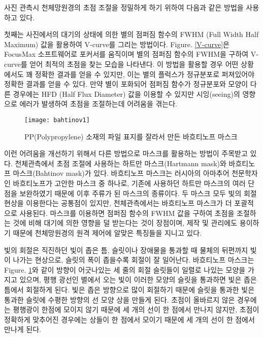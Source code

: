 사진 관측시 천체망원경의 초점 조절을 정밀하게 하기 위하여 다음과 같은 방법을 사용하고 있다. 

첫째는 사진에서의 대기의 상태에 의한 별의 점퍼짐 함수의 FWHM (Full Width Half Maximum) 값을 활용하여 V-curve를 그리는 방법이다. \textrm{Figure}. \ref{V-curve}은 FocusMax 소프트웨어로 포커서를 움직이며 별의 점퍼짐 함수의 FWHM을 구하여 V-curve를 얻어 최적의 초점을 찾는 모습을 나타낸다. 이 방법을 활용할 경우 어떤 상황에서도 꽤 정확한 결과를 얻을 수 있지만, 이는 별의 플럭스가 정규분포로 퍼져있어야 정확한 결과를 얻을 수 있다. 만약 별이 포화되어 점퍼짐 함수가 정규분포와 모양이 다른 경우에는 HFD (Half Flux Diameter) 값을 이용할 수 있지만 시잉(seeing)의 영향으로 에러가 발생하여 초점을 조절하는데 어려움을 겪는다. 

\begin{figure}[h]
	\begin{center}
		\texttt{[image: bahtinov1]}
	\end{center}
	\caption{PP(Polypropylene) 소재의 파일 표지를 잘라서 만든 바흐티노프 마스크}
	\label{bahtinov}
\end{figure}

이런 어려움을 개선하기 위해서 다른 방법으로 마스크를 활용하는 방법이 주목받고 있다. 천체관측에서 초점 조절에 사용하는 하트만 마스크(Hartmann mask)와 바흐티노프 마스크(Bahtinov mask)가 있다. 바흐티노프 마스크는 러시아의 아마추어 천문학자인 바흐티노프가 고안한 마스크 중 하나로, 기존에 사용하던 하트만 마스크의 여러 단점을 보완하였기 때문에 이후 주류가 된 마스크의 종류이다. 두 마스크 모두 빛의 회절 현상을 이용한다는 공통점이 있지만, 천체관측에서는 바흐티노프 마스크가 더 포괄적으로 사용된다. 마스크를 이용하면 점퍼짐 함수의 FWHM 값을 구하여 초점을 조절하는 것에 비해 대기에 의한 영향을 덜 받는다는 것이 장점이며, 제작 및 관리에도 용이하기 때문에 천체망원경의 원격 제어에 알맞은 특징들을 지니고 있다. 

빛의 회절은 직진하던 빛이 좁은 틈, 슬릿이나 장애물을 통과할 때 물체의 뒤편까지 빛이 나가는 현상으로, 슬릿의 폭이 좁을수록 회절이 잘 일어난다. 바흐티노프 마스크는 Figure. \ref{bahtinov}와 같이 방향이 어긋나있는 세 줄의 회절 슬릿들이 일렬로 나있는 모양을 가지고 있으며, 평행 광선인 별에서 오는 빛이 이러한 모양의 슬릿을 통과하면 빛은 좁은 틈에서 회절하게 된다. 빛은 좁은 방향으로 많이 회절하기 때문에 슬릿을 통과한 빛은 통과한 슬릿에 수평한 방향의 선 모양 상을 만들게 된다. 초점이 올바르지 않은 경우에는 평행광이 한점에 모이지 않기 때문에 세 개의 선이 한 점에서 만나지 않지만, 초점이 정확하게 맞추어진 경우에는 상들이 한 점에서 모이기 때문에 세 개의 선이 한 점에서 만나게 된다.

